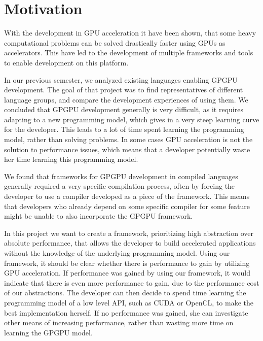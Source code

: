 \section{Motivation}\label{cha:motivation}
With the development in GPU acceleration it have been shown, that some heavy computational problems can be solved drastically faster using GPUs as accelerators. This have led to the development of multiple frameworks and tools to enable development on this platform.

In our previous semester\cite{sw9Report}, we analyzed existing languages enabling GPGPU development. The goal of that project was to find representatives of different language groups, and compare the development experiences of using them. We concluded that GPGPU development generally is very difficult, as it requires adapting to a new programming model, which gives in a very steep learning curve for the developer. This leads to a lot of time spent learning the programming model, rather than solving problems. In some cases GPU acceleration is not the solution to performance issues, which means that a developer potentially waste her time learning this programming model.

We found that frameworks for GPGPU development in compiled languages generally required a very specific compilation process, often by forcing the developer to use a compiler developed as a piece of the framework. This means that developers who already depend on some specific compiler for some feature might be unable to also incorporate the GPGPU framework.



In this project we want to create a framework, prioritizing high abstraction over absolute performance, that allows the developer to build accelerated applications without the knowledge of the underlying programming model. Using our framework, it should be clear whether there is performance to gain by utilizing GPU acceleration. If performance was gained by using our framework, it would indicate that there is even more performance to gain, due to the performance cost of our abstractions. The developer can then decide to spend time learning the programming model of a low level API, such as CUDA or OpenCL, to make the best implementation herself. If no performance was gained, she can investigate other means of increasing performance, rather than wasting more time on learning the GPGPU model.

